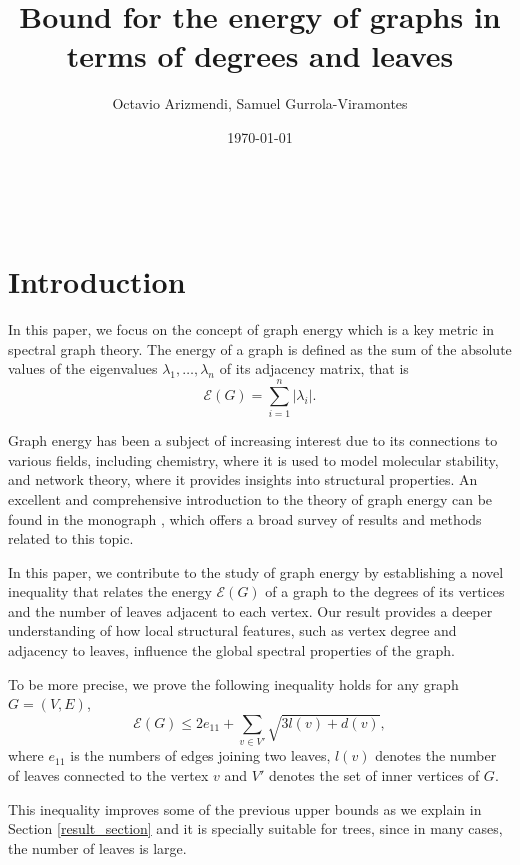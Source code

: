 \documentclass[a4paper]{article}
\title{Bound for the energy of graphs in terms of degrees and leaves}
\author{Octavio Arizmendi, Samuel Gurrola-Viramontes}
\date{\today}
\theoremstyle{plain}
\begin{document}
\maketitle


~

\section{Introduction}

In this paper, we focus on the concept of graph energy which is a key metric in spectral graph theory. The energy of a graph is defined as the sum of the absolute values of the eigenvalues $\lambda_1, \ldots, \lambda_n$ of its adjacency matrix, that is
\[
\mathcal{E}(G)= \sum_{i=1}^{n} |\lambda_i|.
\]

Graph energy has been a subject of increasing interest due to its connections to various fields, including chemistry, where it is used to model molecular stability, and network theory, where it provides insights into structural properties. An excellent and comprehensive introduction to the theory of graph energy can be found in the monograph \cite{Li12}, which offers a broad survey of results and methods related to this topic.

In this paper, we contribute to the study of graph energy by establishing a novel inequality that relates the energy $\mathcal{E}(G)$ of a graph to the degrees of its vertices and the number of leaves adjacent to each vertex. Our result provides a deeper understanding of how local structural features, such as vertex degree and adjacency to leaves, influence the global spectral properties of the graph.

To be more precise, we prove the following inequality holds for any graph \(G = (V,E)\),
\[
    \mathcal{E}(G) \leq 2e_{11} + \sum_{v \in V'} \sqrt{3l(v) + d(v)},
\]
where $e_{11}$ is the numbers of edges joining two leaves, $l(v)$ denotes the number of leaves connected to the vertex $v$ and \(V'\) denotes the set of inner vertices of \(G\).

This inequality improves some of the previous upper bounds as we explain in Section \ref{result_section} and it is specially suitable for trees, since in many cases, the number of leaves is large.  
\end{document}
